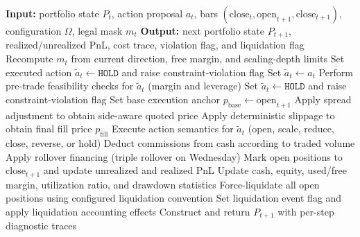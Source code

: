 \begin{algorithm}[!tbp]
\caption{Execution and portfolio update with frictions.}
\label{alg:execution_portfolio_update}
\begin{algorithmic}[1]
\STATE \textbf{Input:} portfolio state $P_t$, action proposal $a_t$, bars
\STATE \hspace*{1em} $(\mathrm{close}_t,\mathrm{open}_{t+1},\mathrm{close}_{t+1})$, configuration $\Omega$, legal mask $m_t$
\STATE \textbf{Output:} next portfolio state $P_{t+1}$, realized/unrealized PnL,
\STATE \hspace*{1em} cost trace, violation flag, and liquidation flag
\STATE Recompute $m_t$ from current direction, free margin, and scaling-depth limits
    \STATE Set executed action $\tilde{a}_t \leftarrow \texttt{HOLD}$ and raise constraint-violation flag
\ELSE
    \STATE Set $\tilde{a}_t \leftarrow a_t$
\ENDIF
\STATE Perform pre-trade feasibility checks for $\tilde{a}_t$ (margin and leverage)
    \STATE Set $\tilde{a}_t \leftarrow \texttt{HOLD}$ and raise constraint-violation flag
\ENDIF
\STATE Set base execution anchor $p_{\mathrm{base}} \leftarrow \mathrm{open}_{t+1}$
\STATE Apply spread adjustment to obtain side-aware quoted price
\STATE Apply deterministic slippage to obtain final fill price $p_{\mathrm{fill}}$
\STATE Execute action semantics for $\tilde{a}_t$ (open, scale, reduce, close, reverse, or hold)
\STATE Deduct commissions from cash according to traded volume
    \STATE Apply rollover financing (triple rollover on Wednesday)
\ENDIF
\STATE Mark open positions to $\mathrm{close}_{t+1}$ and update unrealized and realized PnL
\STATE Update cash, equity, used/free margin, utilization ratio, and drawdown statistics
    \STATE Force-liquidate all open positions using configured liquidation convention
    \STATE Set liquidation event flag and apply liquidation accounting effects
\ENDIF
\STATE Construct and return $P_{t+1}$ with per-step diagnostic traces
\end{algorithmic}
\end{algorithm}
